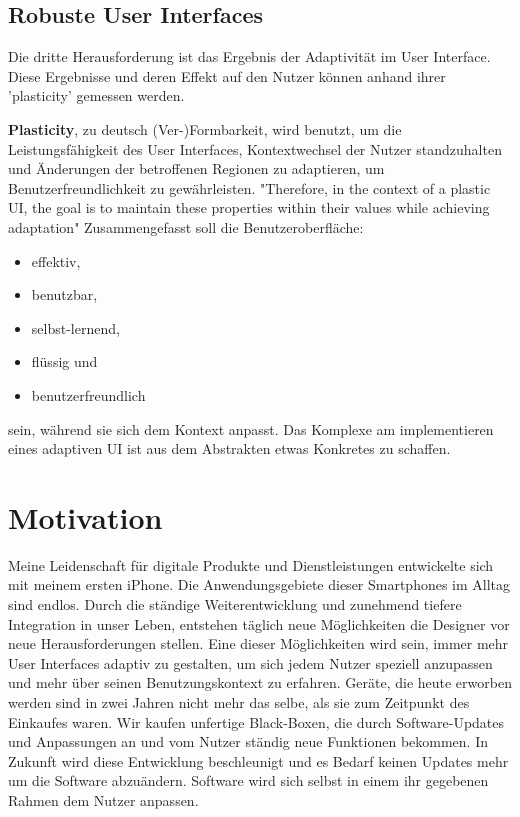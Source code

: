 \subsection{Robuste User Interfaces} %
Die dritte Herausforderung ist das Ergebnis der Adaptivität im User Interface. Diese Ergebnisse und deren Effekt auf den Nutzer
können anhand ihrer 'plasticity' gemessen werden.

\textbf{Plasticity}, zu deutsch (Ver-)Formbarkeit, wird benutzt, um die Leistungsfähigkeit des User Interfaces,
Kontextwechsel der Nutzer standzuhalten und Änderungen der betroffenen Regionen zu adaptieren,
um Benutzerfreundlichkeit zu gewährleisten.
"Therefore, in the context of a plastic UI, the goal is to maintain these properties within their values while achieving adaptation"
Zusammengefasst soll die Benutzeroberfläche:
\begin{itemize}
    \item effektiv,
    \item benutzbar,
    \item selbst-lernend,
    \item flüssig und
    \item benutzerfreundlich
\end{itemize}
sein, während sie sich dem Kontext anpasst. Das Komplexe am implementieren eines adaptiven UI ist aus dem Abstrakten
etwas Konkretes zu schaffen.

\section{Motivation}
Meine Leidenschaft für digitale Produkte und Dienstleistungen entwickelte sich mit meinem ersten iPhone.
Die Anwendungsgebiete dieser Smartphones im Alltag sind endlos. Durch die ständige Weiterentwicklung
und zunehmend tiefere Integration in unser Leben, entstehen täglich neue Möglichkeiten die Designer vor
neue Herausforderungen stellen. Eine dieser Möglichkeiten wird sein, immer mehr User Interfaces adaptiv zu gestalten,
um sich jedem Nutzer speziell anzupassen und mehr über seinen Benutzungskontext zu erfahren. Geräte, die
heute erworben werden sind in zwei Jahren nicht mehr das selbe, als sie zum Zeitpunkt des Einkaufes waren.
Wir kaufen unfertige Black-Boxen,
die durch Software-Updates und Anpassungen an und vom Nutzer ständig neue Funktionen bekommen. %
In Zukunft wird diese Entwicklung beschleunigt und es Bedarf keinen Updates mehr um die Software abzuändern.
Software wird sich selbst in einem ihr gegebenen Rahmen dem Nutzer anpassen.

